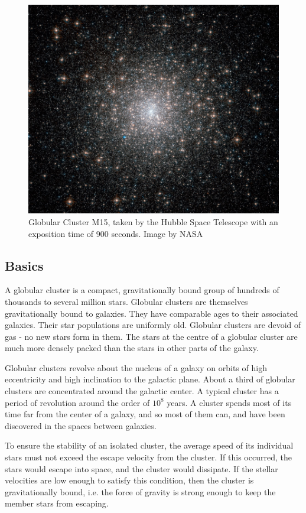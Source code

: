 \begin{figure}[H]
\centering
\includegraphics[width=12cm]{images/m15.jpg}
\caption[M15 Globular Cluster]{Globular Cluster M15, taken by the Hubble Space Telescope with an exposition time of 900 seconds. Image by NASA}
\end{figure}

\subsection{Basics}

A globular cluster is a compact, gravitationally bound group of hundreds of thousands to several million stars. Globular clusters are themselves gravitationally bound to galaxies. They have comparable ages to their associated galaxies. Their star populations are uniformly old. Globular clusters are devoid of gas - no new stars form in them. The stars at the centre of a globular cluster are much more densely packed than the stars in other parts of the galaxy.

Globular clusters revolve about the nucleus of a galaxy on orbits of high eccentricity and high inclination to the galactic plane. About a third of globular clusters are concentrated around the galactic center. A typical cluster has a period of revolution around the order of $ 10^{8} $ years. A cluster spends most of its time far from the center of a galaxy, and so most of them can, and have been discovered in the spaces between galaxies.

To ensure the stability of an isolated cluster, the average speed of its individual stars must not exceed the escape velocity from the cluster. If this occurred, the stars would escape into space, and the cluster would dissipate. If the stellar velocities are low enough to satisfy this condition, then the cluster is gravitationally bound, i.e. the force of gravity is strong enough to keep the member stars from escaping.

